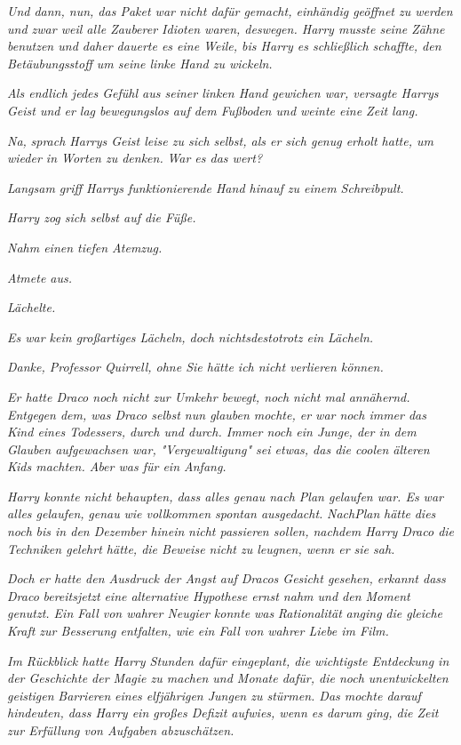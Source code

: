{\emph{Und dann, nun, das Paket war nicht dafür gemacht, einhändig geöffnet zu werden und zwar weil alle Zauberer Idioten waren, deswegen. Harry musste seine Zähne benutzen und daher dauerte es eine Weile, bis Harry es schließlich schaffte, den Betäubungsstoff um seine linke Hand zu wickeln.}

\emph{Als endlich jedes Gefühl aus seiner linken Hand gewichen war, versagte Harrys Geist und er lag bewegungslos auf dem Fußboden und weinte eine Zeit lang.}

\emph{\emph{N}\emph{a}\emph{,}} \emph{sprach Harrys Geist leise zu sich selbst, als er sich genug erholt hatte, um wieder in Worten zu denken.} \emph{\emph{War es das wert?}}

\emph{Langsam griff Harrys funktionierende Hand hinauf zu einem Schreibpult.}

\emph{Harry zog sich selbst auf die Füße.}

\emph{Nahm einen tiefen Atemzug.}

\emph{Atmete aus.}

\emph{Lächelte.}

\emph{Es war kein großartiges Lächeln, doch nichtsdestotrotz ein Lächeln.}

\emph{\emph{Danke, Professor Quirrell, ohne Sie hätte ich nicht verlieren können.}}

\emph{Er hatte Draco noch nicht zur Umkehr bewegt, noch nicht mal annähernd. Entgegen dem, was Draco selbst nun glauben mochte, er war noch immer das Kind eines Todessers, durch und durch. Immer noch ein Junge, der in dem Glauben aufgewachsen war, "Vergewaltigung" sei etwas, das die coolen älteren Kids machten. Aber was für ein Anfang.}

\emph{Harry konnte nicht behaupten, dass alles genau nach Plan gelaufen war. Es war alles gelaufen,} \emph{genau} \emph{wie vollkommen spontan ausgedacht.} \emph{Nach\emph{Plan}} \emph{hätte} \emph{dies} \emph{noch} \emph{bis in den Dezember hinein} \emph{nicht passieren sollen, nachdem Harry Draco die Techniken gelehrt hätte, die Beweise nicht zu leugnen, wenn er sie sah.}

\emph{Doch er hatte den Ausdruck der Angst auf Dracos Gesicht gesehen, erkannt dass Draco} \emph{\emph{bereits}\emph{jetzt}} \emph{eine alternative Hypothese ernst nahm und den Moment genutzt. Ein Fall von wahrer Neugier konnte} \emph{was} \emph{Rationalität} \emph{anging} \emph{die gleiche Kraft zur Besserung entfalten, wie ein Fall von wahrer Liebe im Film.}

\emph{Im Rückblick hatte Harry Stunden dafür eingeplant, die wichtigste Entdeckung in der Geschichte der Magie zu machen und Monate dafür, die noch unentwickelten geistigen} \emph{Barrieren} \emph{eines elfjährigen Jungen zu stürmen. Das mochte darauf hindeuten, dass Harry ein großes Defizit aufwies, wenn es darum ging, die Zeit zur Erfüllung von Aufgaben abzuschätzen.}

}
